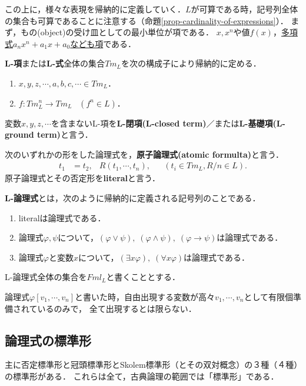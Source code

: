 \documentclass[uplatex, dvipdfmx]{jsreport}
\begin{document}
この上に，様々な表現を帰納的に定義していく．$L$が可算である時，記号列全体の集合も可算であることに注意する（命題\ref{prop-cardinality-of-expressions}）．
まず，もの(object)の受け皿としての最小単位が項である．
$x,x^n$や値$f(x)$，\underline{多項式$a_nx^n+a_1x+a_0$なども項}である．

\begin{definition}[term]
    \textbf{L-項}または\textbf{L-式}全体の集合$Tm_L$を次の構成子により帰納的に定める．
    \begin{enumerate}
        \item  $x,y,z,\cdots,a,b,c,\cdots\in Tm_L$．
        \item  $f:Tm_L^n\to Tm_L\;\;\;(f^n\in L)$．
    \end{enumerate}
    変数$x,y,z,\cdots$を含まないL-項を\textbf{L-閉項(L-closed term)}／または\textbf{L-基礎項(L-ground term)}と言う．
\end{definition}

\begin{definition}[literal]
    次のいずれかの形をした論理式を，\textbf{原子論理式(atomic formulta)}と言う．
    \begin{align*}
        t_1 &= t_2, & R(t_1,\cdots,t_n), && (t_i\in Tm_L, R/n\in L).
    \end{align*}
    原子論理式とその否定形を\textbf{literal}と言う．
\end{definition}

\begin{definition}[formula]
    \textbf{L-論理式}とは，次のように帰納的に定義される記号列のことである．
    \begin{enumerate}
        \item literalは論理式である．
        \item 論理式$\varphi,\psi$について，$(\varphi\lor\psi),\;(\varphi\land\psi),\;(\varphi\to\psi)$は論理式である．
        \item 論理式$\varphi$と変数$x$について，$(\exists x\varphi),\;(\forall x\varphi)$は論理式である．
    \end{enumerate}
    L-論理式全体の集合を$Fml_L$と書くこととする．
\end{definition}
\begin{remark}
    論理式$\varphi[v_1,\cdots,v_n]$と書いた時，自由出現する変数が高々$v_1,\cdots,v_n$として有限個準備されているのみで，
    全て出現するとは限らない．
\end{remark}

\subsection*{論理式の標準形}
主に否定標準形と冠頭標準形とSkolem標準形（とその双対概念）の３種（４種）の標準形がある．
これらは全て，古典論理の範囲では「標準形」である．
\end{document}
